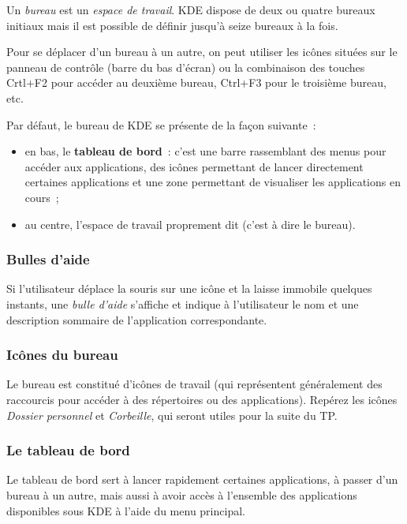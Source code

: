 \documentclass[12pt,a4paper]{article}
\begin{document}
Un \emph{bureau} est un \emph{espace de travail}. KDE dispose de
deux ou quatre bureaux initiaux mais il est possible de définir jusqu'à seize
bureaux à la fois. 

Pour se déplacer d'un bureau à un autre, on peut utiliser les
icônes situées sur le panneau de contrôle (barre du bas d'écran) ou
la combinaison des touches Crtl+F2 pour accéder au deuxième bureau,
Ctrl+F3 pour le troisième bureau, etc. 

Par défaut, le bureau de KDE se présente de la façon suivante~:

\begin{itemize}
\item en bas, le {\bf tableau de bord}~: c'est une barre rassemblant
  des menus pour accéder aux applications, des icônes permettant de
  lancer directement certaines applications et une zone permettant de
  visualiser les applications en cours~;
  
\item au centre, l'espace de travail proprement dit (c'est à dire le
  bureau).
\end{itemize}


\subsubsection{ Bulles d'aide}
Si l'utilisateur déplace la souris sur une icône et la laisse immobile
quelques instants, une \emph{bulle d'aide} s'affiche et indique à
l'utilisateur le nom et une description sommaire de l'application
correspondante. 


\subsubsection{Icônes du bureau}
   Le bureau est constitué d'icônes de travail (qui représentent
   généralement des raccourcis pour accéder à des répertoires ou des
   applications). Repérez les icônes \emph{Dossier personnel} et
   \emph{Corbeille}, qui seront utiles pour la suite du TP.



\subsubsection{Le tableau de bord}
    Le tableau de bord sert à lancer rapidement certaines
    applications, à passer d'un bureau à un autre, mais aussi à avoir
    accès à l'ensemble des applications disponibles sous KDE à l'aide
    du menu principal.
\end{document}
